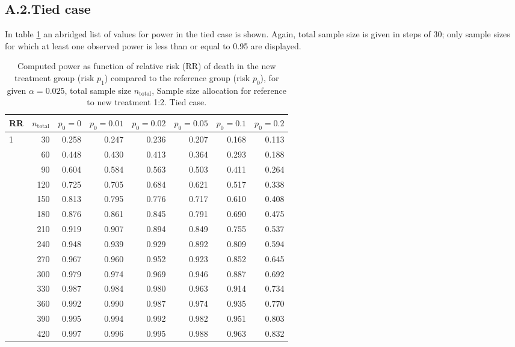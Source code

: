 \documentclass[bimj,fleqn]{w-art}\usepackage[]{graphicx}\usepackage[]{color}
\theoremstyle{plain}
\theoremstyle{definition}
\begin{document}
\subsection*{A.2.\enspace Tied case}
In table \ref{tab:AppendixTied} an abridged list of values for power in the tied
case is shown. Again, total sample size is given in steps of 30; only sample
sizes for which at least one observed power is less than or equal to 0.95 are
displayed.

\begin{table}[ht]
\centering
\caption{Computed power as function of relative risk
             (RR) of death in the new treatment group (risk $p_1$) compared to
             the reference group (risk $p_0$), for given $\alpha =0.025$,
             total sample size $n_{\text{total}}$, Sample size allocation for
             reference to new treatment 1:2. Tied case.} 
\label{tab:AppendixTied}
\begin{tabular}{lrrrrrrr}
  \hline
RR & $n_{\text{total}}$ & $p_0 = 0$ & $p_0 = 0.01$ & $p_0 = 0.02$ & $p_0 = 0.05$ & $p_0 = 0.1$ & $p_0 = 0.2$ \\ 
  \hline
1 & 30 & 0.258 & 0.247 & 0.236 & 0.207 & 0.168 & 0.113 \\ 
   & 60 & 0.448 & 0.430 & 0.413 & 0.364 & 0.293 & 0.188 \\ 
   & 90 & 0.604 & 0.584 & 0.563 & 0.503 & 0.411 & 0.264 \\ 
   & 120 & 0.725 & 0.705 & 0.684 & 0.621 & 0.517 & 0.338 \\ 
   & 150 & 0.813 & 0.795 & 0.776 & 0.717 & 0.610 & 0.408 \\ 
   & 180 & 0.876 & 0.861 & 0.845 & 0.791 & 0.690 & 0.475 \\ 
   & 210 & 0.919 & 0.907 & 0.894 & 0.849 & 0.755 & 0.537 \\ 
   & 240 & 0.948 & 0.939 & 0.929 & 0.892 & 0.809 & 0.594 \\ 
   & 270 & 0.967 & 0.960 & 0.952 & 0.923 & 0.852 & 0.645 \\ 
   & 300 & 0.979 & 0.974 & 0.969 & 0.946 & 0.887 & 0.692 \\ 
   & 330 & 0.987 & 0.984 & 0.980 & 0.963 & 0.914 & 0.734 \\ 
   & 360 & 0.992 & 0.990 & 0.987 & 0.974 & 0.935 & 0.770 \\ 
   & 390 & 0.995 & 0.994 & 0.992 & 0.982 & 0.951 & 0.803 \\ 
   & 420 & 0.997 & 0.996 & 0.995 & 0.988 & 0.963 & 0.832 \\ 

\end{tabular}
\end{table}
\end{document}
